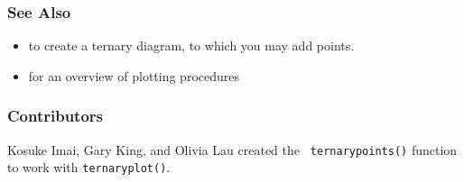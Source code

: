 \subsubsection{See Also}
\begin{itemize}
  \item {} to create a ternary diagram, to which you
may add points.  
  \item {} for an overview of plotting procedures
\end{itemize}

\subsubsection{Contributors}

Kosuke Imai, Gary King, and Olivia Lau created the {\tt
  ternarypoints()} function to work with {\tt ternaryplot()}.    












